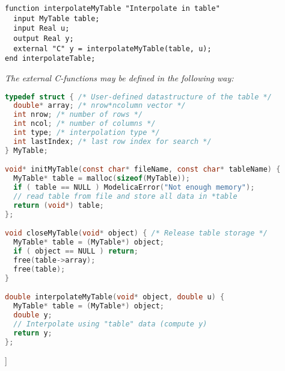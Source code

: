 \begin{lstlisting}[language=modelica]
function interpolateMyTable "Interpolate in table"
  input MyTable table;
  input Real u;
  output Real y;
  external "C" y = interpolateMyTable(table, u);
end interpolateTable;
\end{lstlisting}
\emph{The external C-functions may be defined in the following way:}
\begin{lstlisting}[language=C]
typedef struct { /* User-defined datastructure of the table */
  double* array; /* nrow*ncolumn vector */
  int nrow; /* number of rows */
  int ncol; /* number of columns */
  int type; /* interpolation type */
  int lastIndex; /* last row index for search */
} MyTable;

void* initMyTable(const char* fileName, const char* tableName) {
  MyTable* table = malloc(sizeof(MyTable));
  if ( table == NULL ) ModelicaError("Not enough memory");
  // read table from file and store all data in *table
  return (void*) table;
};

void closeMyTable(void* object) { /* Release table storage */
  MyTable* table = (MyTable*) object;
  if ( object == NULL ) return;
  free(table->array);
  free(table);
}

double interpolateMyTable(void* object, double u) {
  MyTable* table = (MyTable*) object;
  double y;
  // Interpolate using "table" data (compute y)
  return y;
};
\end{lstlisting}
{]}
